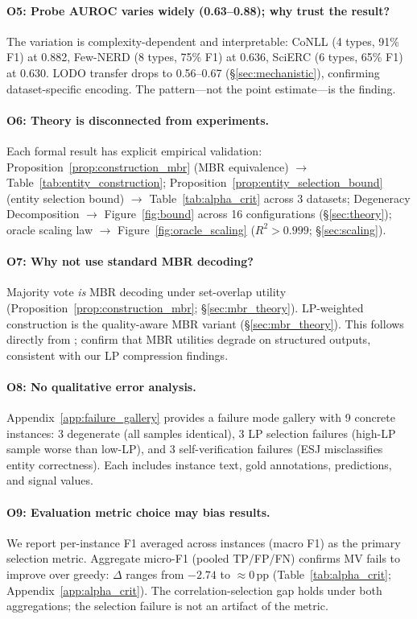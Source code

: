 \paragraph{O5: Probe AUROC varies widely (0.63--0.88); why trust the result?}
The variation is complexity-dependent and interpretable: CoNLL (4 types, 91\% F1) at 0.882, Few-NERD (8 types, 75\% F1) at 0.636, SciERC (6 types, 65\% F1) at 0.630. LODO transfer drops to 0.56--0.67 (\S\ref{sec:mechanistic}), confirming dataset-specific encoding. The pattern---not the point estimate---is the finding.

\paragraph{O6: Theory is disconnected from experiments.}
Each formal result has explicit empirical validation: Proposition~\ref{prop:construction_mbr} (MBR equivalence) $\to$ Table~\ref{tab:entity_construction}; Proposition~\ref{prop:entity_selection_bound} (entity selection bound) $\to$ Table~\ref{tab:alpha_crit} across 3 datasets; Degeneracy Decomposition $\to$ Figure~\ref{fig:bound} across 16 configurations (\S\ref{sec:theory}); oracle scaling law $\to$ Figure~\ref{fig:oracle_scaling} ($R^2 > 0.999$; \S\ref{sec:scaling}).

\paragraph{O7: Why not use standard MBR decoding?}
Majority vote \textit{is} MBR decoding under set-overlap utility (Proposition~\ref{prop:construction_mbr}; \S\ref{sec:mbr_theory}). LP-weighted construction is the quality-aware MBR variant (\S\ref{sec:mbr_theory}). This follows directly from \citet{eikema2022sampling}; \citet{eikema2025structured} confirm that MBR utilities degrade on structured outputs, consistent with our LP compression findings.

\paragraph{O8: No qualitative error analysis.}
Appendix~\ref{app:failure_gallery} provides a failure mode gallery with 9 concrete instances: 3 degenerate (all samples identical), 3 LP selection failures (high-LP sample worse than low-LP), and 3 self-verification failures (ESJ misclassifies entity correctness). Each includes instance text, gold annotations, predictions, and signal values.

\paragraph{O9: Evaluation metric choice may bias results.}
We report per-instance F1 averaged across instances (macro F1) as the primary selection metric. Aggregate micro-F1 (pooled TP/FP/FN) confirms MV fails to improve over greedy: $\Delta$ ranges from $-2.74$ to ${\approx}0$\,pp (Table~\ref{tab:alpha_crit}; Appendix~\ref{app:alpha_crit}). The correlation-selection gap holds under both aggregations; the selection failure is not an artifact of the metric.

